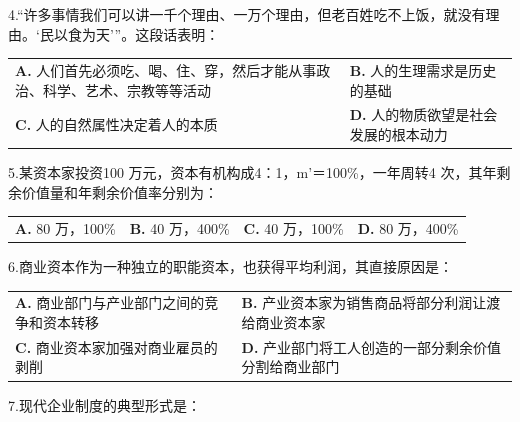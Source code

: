 \documentclass[UTF8,11pt]{ctexart}
\begin{document}
4.“许多事情我们可以讲一千个理由、一万个理由，但老百姓吃不上饭，就没有理由。‘民以食为天’”。这段话表明：


\begin{center}\begin{tabular}{>{\raggedright\arraybackslash}p{\dimexpr(\linewidth-4\tabcolsep)/2\relax}>{\raggedright\arraybackslash}p{\dimexpr(\linewidth-4\tabcolsep)/2\relax}}
\textbf{A.} 人们首先必须吃、喝、住、穿，然后才能从事政治、科学、艺术、宗教等等活动 & \textbf{B.} 人的生理需求是历史的基础\\[.35em]
\textbf{C.} 人的自然属性决定着人的本质 & \textbf{D.} 人的物质欲望是社会发展的根本动力\\[.35em]\end{tabular}\end{center}

5.某资本家投资100 万元，资本有机构成4：1，m’＝100\%，一年周转4 次，其年剩余价值量和年剩余价值率分别为：


\begin{center}\begin{tabular}{>{\raggedright\arraybackslash}p{\dimexpr(\linewidth-8\tabcolsep)/4\relax}>{\raggedright\arraybackslash}p{\dimexpr(\linewidth-8\tabcolsep)/4\relax}>{\raggedright\arraybackslash}p{\dimexpr(\linewidth-8\tabcolsep)/4\relax}>{\raggedright\arraybackslash}p{\dimexpr(\linewidth-8\tabcolsep)/4\relax}}
\textbf{A.} 80 万，100\% & \textbf{B.} 40 万，400\% & \textbf{C.} 40 万，100\% & \textbf{D.} 80 万，400\%\\[.35em]\end{tabular}\end{center}

6.商业资本作为一种独立的职能资本，也获得平均利润，其直接原因是：


\begin{center}\begin{tabular}{>{\raggedright\arraybackslash}p{\dimexpr(\linewidth-4\tabcolsep)/2\relax}>{\raggedright\arraybackslash}p{\dimexpr(\linewidth-4\tabcolsep)/2\relax}}
\textbf{A.} 商业部门与产业部门之间的竞争和资本转移 & \textbf{B.} 产业资本家为销售商品将部分利润让渡给商业资本家\\[.35em]
\textbf{C.} 商业资本家加强对商业雇员的剥削 & \textbf{D.} 产业部门将工人创造的一部分剩余价值分割给商业部门\\[.35em]\end{tabular}\end{center}

7.现代企业制度的典型形式是：
\end{document}
